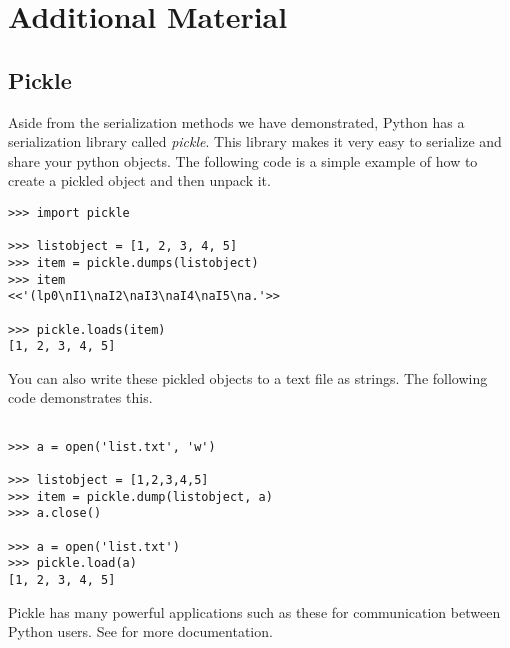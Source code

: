 \newpage

\section*{Additional Material} %

\subsection*{Pickle} %

Aside from the serialization methods we have demonstrated, Python has a serialization library called \emph{pickle}.
This library makes it very easy to serialize and share your python objects.
The following code is a simple example of how to create a pickled object and then unpack it.

\begin{lstlisting}
>>> import pickle

>>> listobject = [1, 2, 3, 4, 5]
>>> item = pickle.dumps(listobject)
>>> item
<<'(lp0\nI1\naI2\naI3\naI4\naI5\na.'>>

>>> pickle.loads(item)
[1, 2, 3, 4, 5]
\end{lstlisting}

You can also write these pickled objects to a text file as strings. The following code demonstrates this.
\begin{lstlisting}

>>> a = open('list.txt', 'w')

>>> listobject = [1,2,3,4,5]
>>> item = pickle.dump(listobject, a)
>>> a.close()

>>> a = open('list.txt')
>>> pickle.load(a)
[1, 2, 3, 4, 5]
\end{lstlisting}

Pickle has many powerful applications such as these for communication between Python users.
See  for more documentation.
